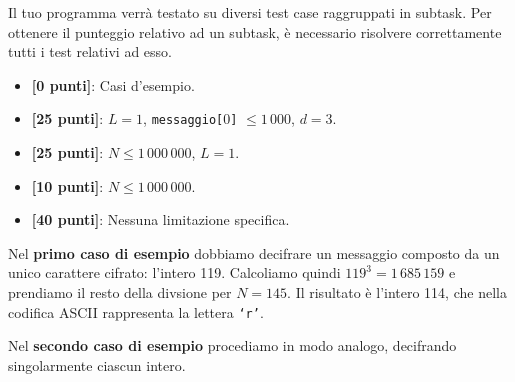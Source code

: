 \Scoring
Il tuo programma verrà testato su diversi test case raggruppati in subtask.
Per ottenere il punteggio relativo ad un subtask, è necessario risolvere
correttamente tutti i test relativi ad esso.
\begin{itemize}[nolistsep,itemsep=2mm]
\item \textbf{ [\phantom{0}0 punti]}: Casi d'esempio.
\item \textbf{ [25 punti]}: $L = 1$, \texttt{messaggio[$0$]} $\le 1\,000$, $d = 3$.
\item \textbf{ [25 punti]}: $N \le 1\,000\,000$, $L = 1$.
\item \textbf{ [10 punti]}: $N \le 1\,000\,000$.
\item \textbf{ [40 punti]}: Nessuna limitazione specifica.
\end{itemize}

\Examples
\begin{example}
%
%
\end{example}

\Explanation

Nel \textbf{primo caso di esempio} dobbiamo decifrare un messaggio composto da un unico carattere cifrato: l'intero 119. Calcoliamo quindi ${119}^3 = 1\,685\,159$ e prendiamo il resto della divsione per $N = 145$. Il risultato è l'intero 114, che nella codifica ASCII rappresenta la lettera \texttt{`r'}.

Nel \textbf{secondo caso di esempio} procediamo in modo analogo, decifrando singolarmente ciascun intero.
